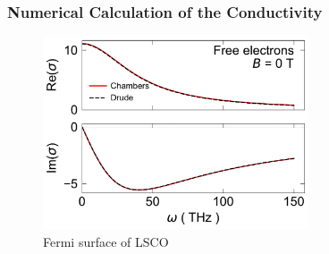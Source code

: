 \documentclass[12pt]{article}
\begin{document}
\subsubsection{Numerical Calculation of the Conductivity}
\begin{figure}
    \centering
    \includegraphics[width=0.7\textwidth]{figures/free_electrons}
    \caption{Fermi surface of LSCO}
    \label{fig:free_electrons}
\end{figure}
\end{document}
